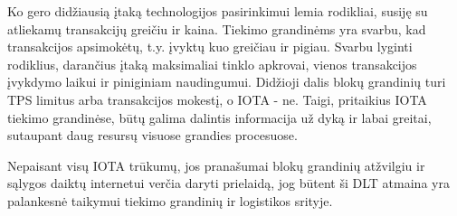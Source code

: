 Ko gero didžiausią įtaką technologijos pasirinkimui lemia rodikliai, susiję su atliekamų transakcijų greičiu ir kaina. Tiekimo grandinėms yra svarbu, kad transakcijos apsimokėtų, t.y. įvyktų kuo greičiau ir pigiau. Svarbu lyginti rodiklius, darančius įtaką maksimaliai tinklo apkrovai, vienos transakcijos įvykdymo laikui ir piniginiam naudingumui. Didžioji dalis blokų grandinių turi TPS limitus arba transakcijos mokestį, o IOTA - ne. Taigi, pritaikius IOTA tiekimo grandinėse, būtų galima dalintis informacija už dyką ir labai greitai, sutaupant daug resursų visuose grandies procesuose.

Nepaisant visų IOTA trūkumų, jos pranašumai blokų grandinių atžvilgiu ir sąlygos daiktų internetui verčia daryti prielaidą, jog būtent ši DLT atmaina yra palankesnė taikymui tiekimo grandinių ir logistikos srityje. 